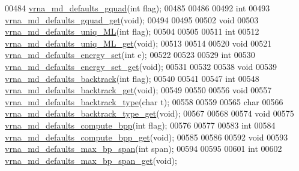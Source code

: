 \begin{DoxyCode}
00484 \mbox{\hyperlink{group__model__details_ga0685ca2aeb39af76f2421fc308163dce}{vrna\_md\_defaults\_gquad}}(\textcolor{keywordtype}{int} flag);
00485 
00486 
00492 \textcolor{keywordtype}{int}
00493 \mbox{\hyperlink{group__model__details_gae645b8612f879eb38b45244fa9eddb9e}{vrna\_md\_defaults\_gquad\_get}}(\textcolor{keywordtype}{void});
00494 
00495 
00502 \textcolor{keywordtype}{void}
00503 \mbox{\hyperlink{group__model__details_ga59b944f61c5d2babec2d4c48c820de67}{vrna\_md\_defaults\_uniq\_ML}}(\textcolor{keywordtype}{int} flag);
00504 
00505 
00511 \textcolor{keywordtype}{int}
00512 \mbox{\hyperlink{group__model__details_gab48e70fd024bf838404bcbcca0c874a0}{vrna\_md\_defaults\_uniq\_ML\_get}}(\textcolor{keywordtype}{void});
00513 
00514 
00520 \textcolor{keywordtype}{void}
00521 \mbox{\hyperlink{group__model__details_ga8dd29c55787a4576277e1907e92d810c}{vrna\_md\_defaults\_energy\_set}}(\textcolor{keywordtype}{int} e);
00522 
00523 
00529 \textcolor{keywordtype}{int}
00530 \mbox{\hyperlink{group__model__details_ga017ed6afb1cba2b7f242412cab618b53}{vrna\_md\_defaults\_energy\_set\_get}}(\textcolor{keywordtype}{void});
00531 
00532 
00538 \textcolor{keywordtype}{void}
00539 \mbox{\hyperlink{group__model__details_ga978c468b2fe96a70d5191e3dd17d5599}{vrna\_md\_defaults\_backtrack}}(\textcolor{keywordtype}{int} flag);
00540 
00541 
00547 \textcolor{keywordtype}{int}
00548 \mbox{\hyperlink{group__model__details_ga90da1156e6883ddd68527c2830706648}{vrna\_md\_defaults\_backtrack\_get}}(\textcolor{keywordtype}{void});
00549 
00550 
00556 \textcolor{keywordtype}{void}
00557 \mbox{\hyperlink{group__model__details_ga68305274de96b56b7799575e222560d8}{vrna\_md\_defaults\_backtrack\_type}}(\textcolor{keywordtype}{char} t);
00558 
00559 
00565 \textcolor{keywordtype}{char}
00566 \mbox{\hyperlink{group__model__details_ga1425b4ebd0e034dead66d79becd64143}{vrna\_md\_defaults\_backtrack\_type\_get}}(\textcolor{keywordtype}{void});
00567 
00568 
00574 \textcolor{keywordtype}{void}
00575 \mbox{\hyperlink{group__model__details_gaf1b5db10f1f476767f9a95f8a78e3132}{vrna\_md\_defaults\_compute\_bpp}}(\textcolor{keywordtype}{int} flag);
00576 
00577 
00583 \textcolor{keywordtype}{int}
00584 \mbox{\hyperlink{group__model__details_gaa3a537e61fbe0518673bf9f73fd820f3}{vrna\_md\_defaults\_compute\_bpp\_get}}(\textcolor{keywordtype}{void});
00585 
00586 
00592 \textcolor{keywordtype}{void}
00593 \mbox{\hyperlink{group__model__details_ga4c4bc962f09b4480cb8499f1cf8ae4ec}{vrna\_md\_defaults\_max\_bp\_span}}(\textcolor{keywordtype}{int} span);
00594 
00595 
00601 \textcolor{keywordtype}{int}
00602 \mbox{\hyperlink{group__model__details_gaa60f989e062fecd4d4bac89c1883da85}{vrna\_md\_defaults\_max\_bp\_span\_get}}(\textcolor{keywordtype}{void});

\end{DoxyCode}
